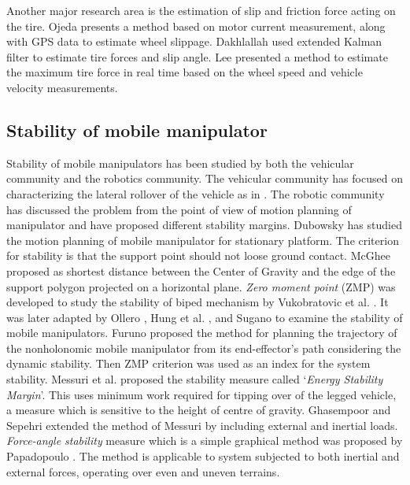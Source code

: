   
   Another major research area is the estimation of slip and friction force acting on the tire. Ojeda \cite{ojeda2006current} presents a method based on motor current measurement, along with GPS data to estimate wheel slippage. Dakhlallah \cite{dakhlallah2008tire}  used extended Kalman filter to estimate tire forces and slip angle. Lee \cite{lee2004real}  presented a method to estimate the maximum tire force in real time based on the wheel speed and vehicle velocity measurements.

\subsection{Stability of mobile manipulator}
Stability of mobile manipulators has been studied by both the vehicular community and the robotics community. The vehicular community has focused on characterizing the lateral rollover of the vehicle as in  \cite{buchele1990computer,jones1990engineering}. The robotic community has discussed the  problem from the point of view of  motion planning of manipulator and have proposed different stability margins. Dubowsky \cite{dubowsky1989planning} has studied the motion planning of mobile manipulator for stationary platform. The criterion for stability is that the support point should not loose ground contact. McGhee \cite{mcghee1968stability} proposed as shortest distance between the Center of Gravity  and the edge of the support polygon projected on a horizontal plane. \textit{Zero moment point} (ZMP) was developed to study the stability of biped mechanism by  Vukobratovic et al. \cite{vukobratovic1969contribution,vukobratovic2012biped}. It was later adapted by Ollero \cite{ollero1995stability}, Hung et al. \cite{huang1995manipulator,huang1994stability},  and Sugano \cite{sugano1993stability} to examine the stability of mobile manipulators. Furuno \cite{furuno2003trajectory} proposed the method for planning the trajectory of the nonholonomic mobile manipulator from its end-effector's path  considering the dynamic stability. Then ZMP criterion was used as an index for the system stability. Messuri et al. \cite{messuri1985automatic} proposed the stability measure called `\textit{Energy Stability Margin}'. This uses  minimum work required for tipping over of the legged vehicle, a measure which is sensitive to the height of centre of gravity. Ghasempoor and Sepehri \cite{ghasempoor1995measure}  extended the method of Messuri by including  external and inertial loads.   \textit{ Force-angle stability} measure which is a simple graphical method was proposed by Papadopoulo \cite{papadopoulos1996new,papadopoulos2000force}. The method is applicable to system subjected to both inertial and external forces, operating over even and uneven terrains. 
